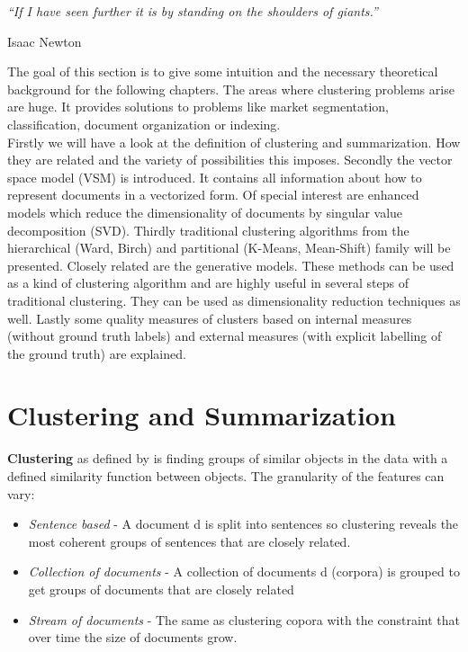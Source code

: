 \epigraph{\emph{
  ``If I have seen further it is by standing on the shoulders of giants.''
}}{ Isaac Newton }

The goal of this section is to give some intuition and the necessary theoretical background for the following chapters. The areas where clustering problems arise are huge. It provides solutions to problems like market segmentation, classification, document organization or indexing.\\
Firstly we will have a look at the definition of clustering and summarization. How they are related and the variety of possibilities this imposes.
Secondly the vector space model (VSM) is introduced. It contains all information about how to represent documents in a vectorized form. Of special interest are enhanced models which reduce the dimensionality of documents by singular value decomposition (SVD).
Thirdly traditional clustering algorithms from the hierarchical (Ward, Birch) and partitional (K-Means, Mean-Shift) family will be presented.
Closely related are the generative models. These methods can be used as a kind of clustering algorithm and are highly useful in several steps of traditional clustering. They can be used as dimensionality reduction techniques as well.
Lastly some quality measures of clusters based on internal measures (without ground truth labels) and external measures (with explicit labelling of the ground truth) are explained.


\section{Clustering and Summarization}
  
  \textbf{Clustering} as defined by \cite{ClusterAlgoSurveyIBM} is finding groups of similar objects in the data with a defined similarity function between objects. The granularity of the features can vary:

  \begin{itemize}
    \item \emph{Sentence based} - A document d is split into sentences so clustering reveals the most coherent groups of sentences that are closely related.
    \item \emph{Collection of documents} - A collection of documents d (corpora) is grouped to get groups of documents that are closely related
    \item \emph{Stream of documents} - The same as clustering copora with the constraint that over time the size of documents grow.
  \end{itemize}

